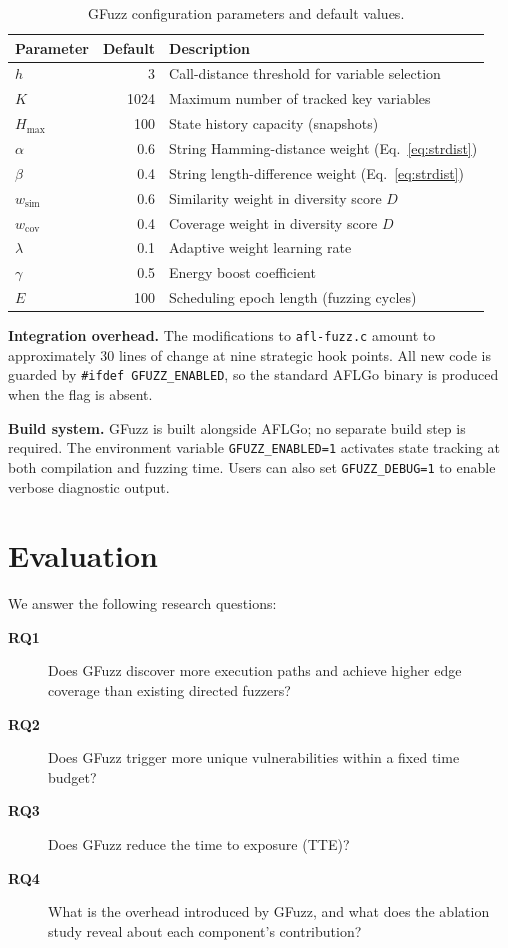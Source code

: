 \documentclass[preprint,12pt,3p]{elsarticle}
\begin{document}
\begin{table}[t]
\centering
\small
\caption{GFuzz configuration parameters and default values.}
\label{tbl:params}
\begin{tabular}{lrl}
\toprule
\textbf{Parameter} & \textbf{Default} & \textbf{Description} \\
\midrule
$h$   & 3    & Call-distance threshold for variable selection \\
$K$   & 1024 & Maximum number of tracked key variables \\
$H_{\max}$ & 100 & State history capacity (snapshots) \\
$\alpha$ & 0.6 & String Hamming-distance weight (Eq.~\ref{eq:strdist}) \\
$\beta$  & 0.4 & String length-difference weight (Eq.~\ref{eq:strdist}) \\
$w_{\text{sim}}$ & 0.6 & Similarity weight in diversity score $D$ \\
$w_{\text{cov}}$ & 0.4 & Coverage weight in diversity score $D$ \\
$\lambda$ & 0.1 & Adaptive weight learning rate \\
$\gamma$  & 0.5 & Energy boost coefficient \\
$E$ & 100 & Scheduling epoch length (fuzzing cycles) \\
\bottomrule
\end{tabular}
\end{table}

\textbf{Integration overhead.}  The modifications to \texttt{afl-fuzz.c}
amount to approximately 30 lines of change at nine strategic hook points.
All new code is guarded by \texttt{\#ifdef GFUZZ\_ENABLED}, so the standard
AFLGo binary is produced when the flag is absent.

\textbf{Build system.}  GFuzz is built alongside AFLGo; no separate build
step is required.  The environment variable \texttt{GFUZZ\_ENABLED=1}
activates state tracking at both compilation and fuzzing time.  Users can
also set \texttt{GFUZZ\_DEBUG=1} to enable verbose diagnostic output.

\section{Evaluation}
\label{sec:eval}

We answer the following research questions:
\begin{description}
  \item[\textbf{RQ1}] Does GFuzz discover more execution paths and achieve
    higher edge coverage than existing directed fuzzers?
  \item[\textbf{RQ2}] Does GFuzz trigger more unique vulnerabilities within
    a fixed time budget?
  \item[\textbf{RQ3}] Does GFuzz reduce the time to exposure (TTE)?
  \item[\textbf{RQ4}] What is the overhead introduced by GFuzz, and what does
    the ablation study reveal about each component's contribution?
\end{description}
\end{document}
